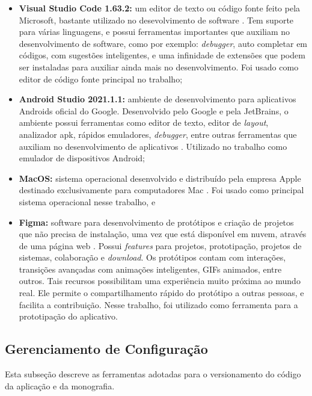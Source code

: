 \begin{itemize}

    \item \textbf{Visual Studio Code 1.63.2: }um editor de texto ou código fonte feito pela Microsoft, 
	bastante utilizado no desevolvimento de software \cite{vscode2015}. Tem suporte 
	para várias linguagens, e possui ferramentas importantes que auxiliam no 
	desenvolvimento de software, como por exemplo: \emph{debugger}, auto completar em 
	códigos, com sugestões inteligentes, e uma infinidade de extensões que podem ser instaladas 
	para auxiliar ainda mais no desenvolvimento. Foi usado como editor de código fonte 
	principal no trabalho;
    \item \textbf{Android Studio 2021.1.1: }ambiente de desenvolvimento para 
	aplicativos Androids oficial do Google. Desenvolvido pelo Google e pela 
	JetBrains, o ambiente possui ferramentas como editor de texto, editor de \emph{layout}, 
	analizador apk, rápidos emuladores, \emph{debugger}, entre outras ferramentas 
	que auxiliam no desenvolvimento de aplicativos \cite{android2020}. Utilizado no 
	trabalho como emulador de dispositivos Android;
    \item \textbf{MacOS: }sistema operacional desenvolvido e distribuído pela empresa Apple
	destinado exclusivamente para computadores Mac \cite{apple}. 
	Foi usado como principal sistema operacional nesse trabalho, e
	\item \textbf{Figma: }software para desenvolvimento de protótipos e 
	criação de projetos que não precisa de instalação, uma vez que está disponível 
	em nuvem, através de uma página web \cite{figma2020}. Possui \emph{features} para projetos, prototipação, 
	projetos de sistemas, colaboração e \emph{download}. Os protótipos contam com 
	interações, transições avançadas com animações inteligentes, GIFs animados, 
	entre outros. Tais recursos possibilitam uma experiência muito próxima ao mundo 
	real. Ele permite o compartilhamento rápido do protótipo a outras pessoas, e 
	facilita a contribuição. Nesse trabalho, foi utilizado como ferramenta para a 
	prototipação do aplicativo. 

\end{itemize}

\subsection{Gerenciamento de Configuração}

Esta subseção descreve as ferramentas adotadas para o versionamento do código da aplicação e da monografia.

